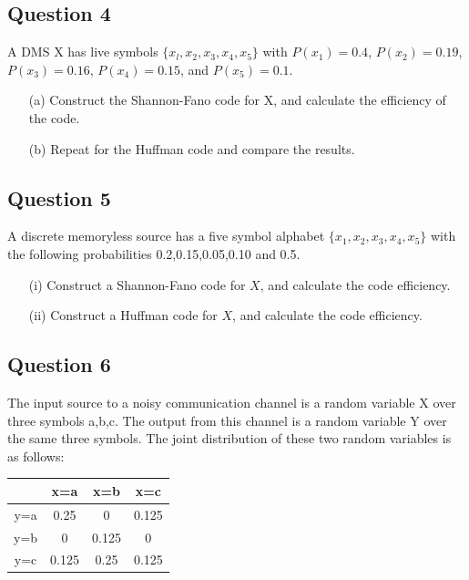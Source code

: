 \documentclass[a4paper,12pt]{article}
\begin{document}
\subsection*{Question 4}
A DMS X has live symbols $\{x_l,x_2,x_3,x_4,x_5\}$ with $P(x_1) = 0.4$, $P(x_2)=0.19$, $P(x_3) =0.16$,
$P(x_4) = 0.15$, and $P(x_5) = 0.1$.
\begin{itemize}
\item[(a)] Construct the Shannon-Fano code for X, and calculate the efficiency of the code.
\item[(b)] Repeat for the Huffman code and compare the results.
\end{itemize}

\subsection*{Question 5}

A discrete memoryless source has a five symbol alphabet $\{x_1,x_2,x_3,x_4,x_5\}$ with the following probabilities 0.2,0.15,0.05,0.10 and 0.5.

\begin{itemize}
\item[(i)] Construct a Shannon-Fano code for $X$, and calculate the code efficiency.
\item[(ii)] Construct a Huffman code for $X$, and calculate the code efficiency.
\end{itemize}


\subsection*{Question 6}

The input source to a noisy communication channel is a random variable X over three symbols a,b,c. The output from this channel is a random variable Y over the same three symbols. The joint distribution of these two random variables is as follows:


\begin{center}
\begin{tabular}{|c|c|c|c|}
\hline	 &x=a	&x=b&	     x=c\\ \hline
y=a	 &0.25	&0	 &    0.125 \\ \hline
y=b	 &0	    &0.125&	 0 \\ \hline
y=c	 &0.125&	0.25&	 0.125 \\ \hline
\end{tabular} 
\end{center}
\end{document}

